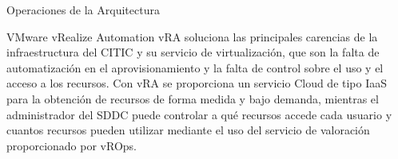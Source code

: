\begin{subsection}{Operaciones de la Arquitectura}
\begin{subsubsection}{VMware vRealize Automation}
        vRA soluciona las principales carencias de la infraestructura del CITIC y su servicio de virtualización, que son la falta de automatización en el aprovisionamiento y la falta de control sobre el uso y el acceso a los recursos. Con vRA se proporciona un servicio Cloud de tipo IaaS para la obtención de recursos de forma medida y bajo demanda, mientras el administrador del SDDC puede controlar a qué recursos accede cada usuario y cuantos recursos pueden utilizar mediante el uso del servicio de valoración proporcionado por vROps.

\end{subsubsection}
\end{subsection}
